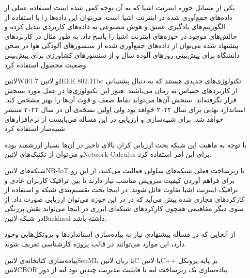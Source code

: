 
یکی از مسائل حوزه اینترنت اشیا که به آن توجه کمی شده است استفاده عملی از داده‌های جمع‌آوری شده در اینترنت اشیا است. می‌توان این داده‌ها را با استفاده از الگوریتم‌های یادگیری عمیق و هوش مصنوعی به داده‌های کاربردی تبدیل کرده
و چالش‌های موجود در حوزه‌های اینترنت اشیا را پاسخ داد. به طور مثال در کاربردهای پیشنهاد شده می‌توان از داده‌های جمع‌آوری شده از سنسورهای آلودگی هوا در صحن دانشگاه برای پیش‌بینی روزهای آلوده سال و از سنسورهای کشاورزی
برای پیش‌بینی وضعیت محصول استفاده کرد.


‌لاتین{WiFi 7} و ‌لاتین{IEEE 802.11be} تکنولوژی‌های جدیدی هستند که به دنبال پشتیبانی از کاربردهای حساس به زمان می‌باشند. هنوز این تکنولوژی‌ها در عمل مورد سنجش قرار نگرفته‌اند.
سنجش آن‌ها می‌تواند نقاط ضعف و قوت آن‌ها را بهتر مشخص کند. استاندارد نهایی برای سال ۲۰۲۴ خواهد بود ولی اولین نسخه‌ی آن در سال ۲۰۲۲ منتشر خواهد شد. برای شبیه‌سازی و ارزیابی در این
مساله می‌بایست از نرم‌افزارهای شبیه‌ساز استفاده کرد.

با توجه به ماهیت این شبکه بحث ارزیابی کران بالای تاخیر در آن‌ها بسیار ارزشمند بوده و می‌توان از تکنیک‌های ‌لاتین{Network Calculus} برای این امر استفاده کرد.


شبکه‌های ‌لاتین{NB-IoT} با زیرساخت فعلی شبکه‌های سلولی فعالیت می‌کنند، از این رو برای فراهم آوردن کیفیت سرویس مناسب نیاز دارند تا بین ترافیک کاربران عادی
و ترافیک اینترنت اشیا تفاوت قائل شوند. در اینجا بحث تقسیم‌بندی شبکه و استفاده از کارکردهای مجازی شده پیش می‌آید که در در این حوزه می‌توان ارزیابی صورت داد.
از سوی دیگر مفاهیمی همچون کارکردهای شبکه‌ای ابرزی در اینجا می‌تواند نقش پررنگی در شبکه ‌لاتین{Backhaul} داشته باشد.


از آنجایی که در مساله پیشنهادی نیاز به پیاده‌سازی استانداردها و پروتکل‌هایی وجود دارد، این موارد می‌توانند در قالب پروژه کارشناسی تعریف شوند.

 پیاده‌سازی کتابخانه‌ی ‌لاتین{SenML} با زبان ‌لاتین{C} یا ‌لاتین{C++} بر پایه پروتکل ‌لاتین{CBOR}
 پیاده‌سازی یک زیرساخت لبه با قابلیت مدیریت چندین نود لبه از دور
